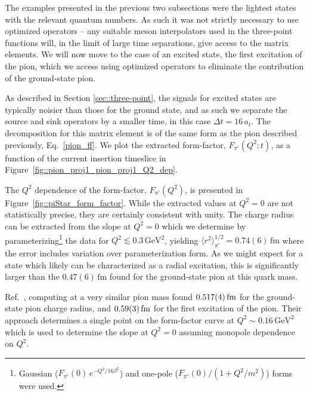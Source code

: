 \documentclass[twocolumn,amsmath,amssymb,prd,10pt,floatfix, 
superscriptaddress,nofootinbib, showpacs, preprintnumbers]{revtex4-1}
\begin{document}
The examples presented in the previous two subsections were the lightest states with the relevant quantum numbers. As such it was not strictly necessary to use optimized operators -- any suitable meson interpolators used in the three-point functions will, in the limit of large time separations, give access to the matrix elements. We will now move to the case of an excited state, the first excitation of the pion, which we access using optimized operators to eliminate the contribution of the ground-state pion.

As described in Section \ref{sec::three-point}, the signals for excited states are typically noisier than those for the ground state, and as such we separate the source and sink operators by a smaller time, in this case $\Delta t = 16 \, a_t$. The decomposition for this matrix element is of the same form as the pion described previously, Eq.~\ref{pion_ff}. We plot the extracted form-factor, $F_{\pi'}(Q^2; t)$, as a function of the current insertion timeslice in Figure~\ref{fig::pion_proj1_pion_proj1_Q2_dep}. 


The $Q^2$ dependence of the form-factor, $F_{\pi'}(Q^2)$, is presented in Figure~\ref{fig::piStar_form_factor}. While the extracted values at $Q^2=0$ are not statistically precise, they are certainly consistent with unity. The charge radius can be extracted from the slope at $Q^2=0$ which we determine by parameterizing\footnote{
Gaussian ($F_{\pi'}(0) \, e^{-Q^2/16\beta^2}$) and one-pole ($F_{\pi'}(0) / (1 + Q^2 / m^2 )$) forms were used.  
}
 the data for $Q^2 \lesssim 0.3\,\mathrm{GeV}^2$, yielding ${   \langle r^2 \rangle_{\pi'}^{1/2} = 0.74(6) \, \mathrm{fm} }$ where the error includes variation over parameterization form. As we might expect for a state which likely can be characterized as a radial excitation, this is significantly larger than the $0.47(6)\,\mathrm{fm}$ found for the ground-state pion at this quark mass. 
 
Ref.~\cite{Owen:2015gva}, computing at a very similar pion mass found $0.517(4)\,{\rm fm}$ for the ground-state pion charge radius, and $0.59(3)\,{\rm fm}$ for the first excitation of the pion. Their approach determines a single point on the form-factor curve at $Q^2\sim 0.16 \,\mathrm{GeV^2}$ which is used to determine the slope at $Q^2=0$ assuming monopole dependence on $Q^2$. 
\end{document}
